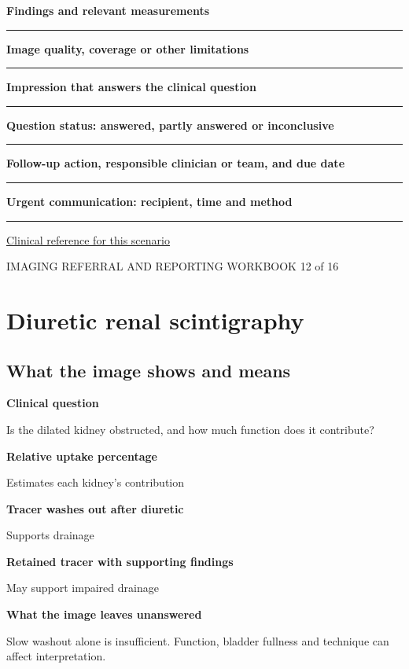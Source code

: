 \documentclass[11pt,a4paper]{article}
\newcommand{\record}[1]{\textbf{#1}\par\vspace{0.55\baselineskip}\hrule\vspace{0.35\baselineskip}}
\begin{document}
\record{Findings and relevant measurements}

\record{Image quality, coverage or other limitations}

\record{Impression that answers the clinical question}

\record{Question status: answered, partly answered or inconclusive}

\record{Follow-up action, responsible clinician or team, and due date}

\record{Urgent communication: recipient, time and method}

\small\href{https://snmmi.org/Web/Web/Clinical-Practice/Procedure-Standards/Standards/Diuretic-Renal-Scintigraphy-in-Adults-With-Suspected-Upper-Urinary-Tract-Obstruction-1-0.aspx}{Clinical reference for this scenario}

\normalsize

\newpage

{\small IMAGING REFERRAL AND REPORTING WORKBOOK \hfill 12 of 16}

\section*{Diuretic renal scintigraphy}

\subsection*{What the image shows and means}

\textbf{Clinical question}\par Is the dilated kidney obstructed, and how much function does it contribute?\par

\textbf{Relative uptake percentage}\par Estimates each kidney's contribution\par

\textbf{Tracer washes out after diuretic}\par Supports drainage\par

\textbf{Retained tracer with supporting findings}\par May support impaired drainage\par

\textbf{What the image leaves unanswered}\par Slow washout alone is insufficient. Function, bladder fullness and technique can affect interpretation.\par
\end{document}
